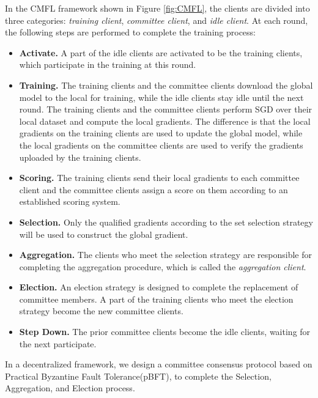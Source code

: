 \documentclass[10pt,journal,compsoc]{IEEEtran}
\begin{document}
In the CMFL framework shown in Figure \ref{fig:CMFL}, the clients are divided into three categories: \textit{training client}, \textit{committee client}, and \textit{idle client}. At each round, the following steps are performed to complete the training process:

\begin{itemize}
\item \textbf{Activate.} A part of the idle clients are activated to be the training clients, which participate in the training at this round.
\item \textbf{Training.} The training clients and the committee clients download the global model to the local for training, while the idle clients stay idle until the next round. The training clients and the committee clients perform SGD over their local dataset and compute the local gradients. The difference is that the local gradients on the training clients are used to update the global model, while the local gradients on the committee clients are used to verify the gradients uploaded by the training clients. 
\item \textbf{Scoring.} The training clients send their local gradients to each committee client and the committee clients assign a score on them according to an established scoring system. 
\item \textbf{Selection.} Only the qualified gradients according to the set selection strategy will be used to construct the global gradient. 
\item \textbf{Aggregation.} The clients who meet the selection strategy are responsible for completing the aggregation procedure, which is called the \textit{aggregation client}. 
\item \textbf{Election.} An election strategy is designed to complete the replacement of committee members. A part of the training clients who meet the election strategy become the new committee clients.
\item \textbf{Step Down.} The prior committee clients become the idle clients, waiting for the next participate.
\end{itemize}

In a decentralized framework, we design a committee consensus protocol based on Practical Byzantine Fault Tolerance(pBFT)\cite{PBFT}, to complete the Selection, Aggregation, and Election process.
\end{document}
